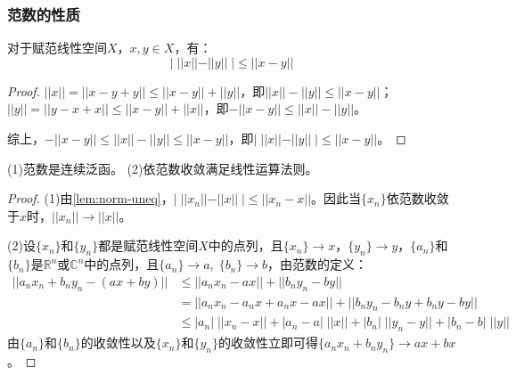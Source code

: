 \subsubsection{范数的性质}
\begin{lemma}\label{lem:norm-uneq}
	对于赋范线性空间$X$，$x,y\in X$，有：
	\begin{equation*}
		|\;||x||-||y||\;|\leqslant||x-y||
	\end{equation*}
\end{lemma}
\begin{proof}
	$||x||=||x-y+y||\leqslant||x-y||+||y||$，即$||x||-||y||\leqslant||x-y||$；$||y||=||y-x+x||\leqslant||x-y||+||x||$，即$-||x-y||\leqslant||x||-||y||$。\par
	综上，$-||x-y||\leqslant||x||-||y||\leqslant||x-y||$，即$|\;||x||-||y||\;|\leqslant||x-y||$。
\end{proof}
\begin{property}
	(1)范数是连续泛函。
	(2)依范数收敛满足线性运算法则。 
\end{property}
\begin{proof}
	(1)由\cref{lem:norm-uneq}，$|\;||x_n||-||x||\;|\leqslant||x_n-x||$。因此当$\{x_n\}$依范数收敛于$x$时，$||x_n||\to||x||$。\par
	(2)设$\{x_n\}$和$\{y_n\}$都是赋范线性空间$X$中的点列，且$\{x_n\}\rightarrow x$，$\{y_n\}\rightarrow y$，$\{a_n\}$和$\{b_n\}$是$\mathbb{R}^{n}$或$\mathbb{C}^{n}$中的点列，且$\{a_n\}\to a,\;\{b_n\}\to b$，由范数的定义：
	\begin{align*}
		||a_nx_n+b_ny_n-(ax+by)||
		&\leqslant||a_nx_n-ax||+||b_ny_n-by|| \\
		&=||a_nx_n-a_nx+a_nx-ax||+||b_ny_n-b_ny+b_ny-by|| \\
		&\leqslant|a_n|\;||x_n-x||+|a_n-a|\;||x||+|b_n|\;||y_n-y||+|b_n-b|\;||y||
	\end{align*}
	由$\{a_n\}$和$\{b_n\}$的收敛性以及$\{x_n\}$和$\{y_n\}$的收敛性立即可得$\{a_nx_n+b_ny_n\}\to ax+bx$。
\end{proof}
